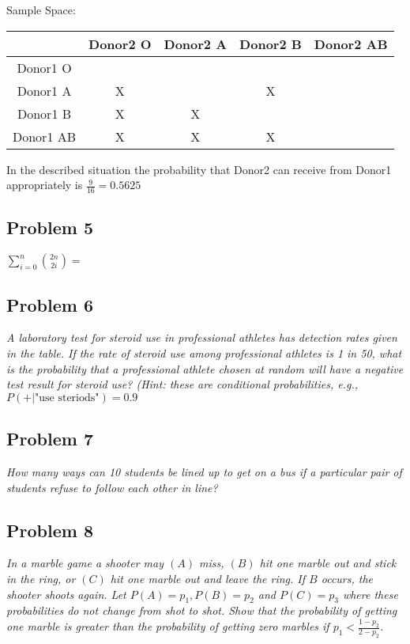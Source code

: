 \documentclass[a4paper,man,natbib]{apa6}
\begin{document}
Sample Space: \\
\begin{tabular}{|c|c|c|c|c|}
	\hline
	& Donor2 O & Donor2 A & Donor2 B & Donor2 AB \\
	\hline Donor1 O   & \checkmark &  \checkmark & \checkmark  & \checkmark \\
	\hline Donor1 A   & X & \checkmark  & X & \checkmark \\
	\hline Donor1 B   & X & X & \checkmark  & \checkmark  \\
	\hline Donor1 AB & X  & X & X &  \checkmark  \\
	\hline
\end{tabular}

	In the described situation the probability that Donor2 can receive from Donor1 appropriately is
	$\frac{9}{16} = 0.5625$

\subsection{Problem 5}
\emph{  $\sum_{i=0}^{n} \binom{2n}{2i} =$  }\vspace{1em}

\subsection{Problem 6}
\emph{A laboratory test for steroid use in professional athletes has detection rates given in the table.
	If the rate of steroid use among professional athletes is 1 in 50, what is the probability that a professional athlete chosen at random will have a negative test result for steroid use? (Hint: these are conditional probabilities, e.g., $P(\plus| \text{"use steriods"})=0.9$
}\vspace{1em}

\subsection{Problem 7}
\emph{How many ways can 10 students be lined up to get on a bus if a particular pair of students refuse to follow each other in line?}\vspace{1em}

\subsection{Problem 8}
\emph{ 
	In a marble game a shooter may $(A)$ miss, $(B)$ hit one marble out and stick in the ring, or $(C)$ hit one marble out and leave the ring. If $B$ occurs, the shooter shoots again. Let  $P(A)=p_1, P(B)=p_2$ and $P(C)=p_3$ where these probabilities do not change from shot to shot. Show that the probability of getting one marble is greater than the probability of getting zero marbles if $p_1 < \frac{1-p_2}{2-p_2}$. }\vspace{1em}
\end{document}

